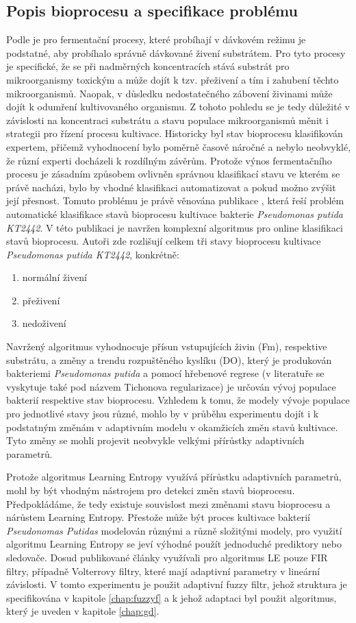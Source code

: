 \documentclass[11pt,twoside,openright]{report}
\begin{document}
\begin{appendices}
\subsection{Popis bioprocesu a specifikace problému}
Podle \cite{fermentace} je pro fermentační procesy, které probíhají v dávkovém režimu je podstatné, aby probíhalo správně dávkované živení substrátem. Pro tyto procesy je specifické, že se při nadměrných koncentracích stává substrát pro mikroorganismy toxickým a může dojít k tzv. přeživení a tím i zahubení těchto mikroorganismů. Naopak, v důsledku nedostatečného zábovení živinami může dojít k odumření kultivovaného organismu. Z tohoto pohledu se je tedy důležité v závislosti na koncentraci substrátu a stavu populace mikroorganismů měnit i strategii pro řízení procesu kultivace. Historicky byl stav bioprocesu klasifikován expertem, přičemž vyhodnocení bylo poměrně časově náročné a nebylo neobvyklé, že různí experti docházeli k rozdílným závěrům. Protože výnos fermentačního procesu je zásadním způsobem ovlivněn správnou klasifikací stavu ve kterém se právě nacházi, bylo by vhodné klasifikaci automatizovat a pokud možno zvýšit její přesnost. Tomuto problému je právě věnována publikace \cite{fermentace}, která řeší problém automatické klasifikace stavů bioprocesu kultivace bakterie \textit{Pseudomonas putida KT2442}. V této publikaci je navržen komplexní algoritmus pro online klasifikaci stavů bioprocesu. Autoři zde rozlišují celkem tři stavy bioprocesu kultivace \textit{Pseudomonas putida KT2442}, konkrétně:
\begin{enumerate}
    \item normální živení
    \item přeživení
    \item nedoživení
\end{enumerate}
Navržený algoritmus vyhodnocuje přísun vstupujících živin (Fm), respektive substrátu, a změny a trendu rozpuštěného kyslíku (DO), který je produkován bakteriemi \textit{Pseudomonas putida} a pomocí hřebenové regrese (v literatuře se vyskytuje také pod názvem Tichonova regularizace) je určován vývoj populace bakterií respektive stav bioprocesu. Vzhledem k tomu, že modely vývoje populace pro jednotlivé stavy jsou různé, mohlo by v průběhu experimentu dojít i k podstatným změnám v adaptivním modelu v okamžicích změn stavů kultivace. Tyto změny se mohli projevit neobvykle velkými přírůstky adaptivních parametrů. 
\par
Protože algoritmus Learning Entropy využívá přírůstku adaptivních parametrů, mohl by být vhodným nástrojem pro detekci změn stavů bioprocesu. Předpokládáme, že tedy existuje souvislost mezi změnami stavu bioprocesu a nárůstem Learning Entropy. Přestože může být proces kultivace bakterií \textit{Pseudonomas Putidas} modelován různými a různě složitými modely, pro využití algoritmu Learning Entropy se jeví výhodné použít jednoduché prediktory nebo sledovače. Dosud publikované články využívali pro algoritmus LE pouze FIR filtry, případně Volterrovy filtry, které mají adaptivní parametry v lineární závislosti. V tomto experimentu je použit adaptivní fuzzy filtr, jehož struktura je specifikována v kapitole \ref{chap:fuzzyf} a k jehož adaptaci byl použit algoritmus, který je uveden v kapitole \ref{chap:gd}.

\end{appendices}
\end{document}

